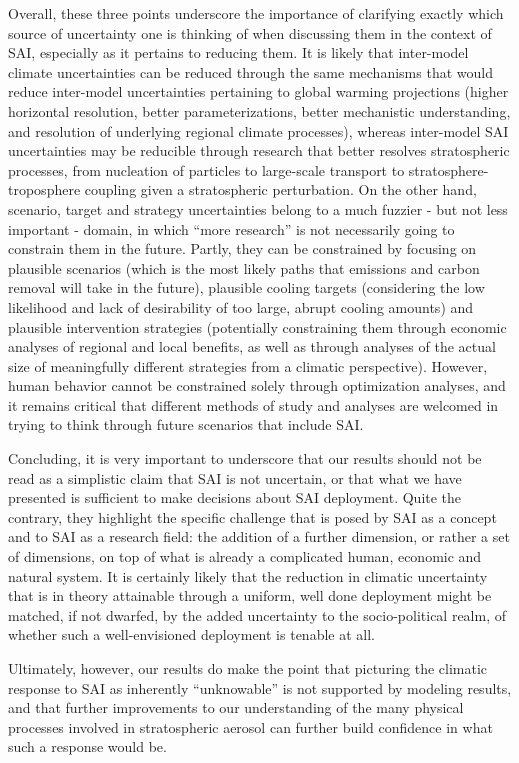 \documentclass[acp, manuscript]{copernicus}
\begin{document}
Overall, these three points underscore the importance of clarifying exactly which source of uncertainty one is thinking of when discussing them in the context of SAI, especially as it pertains to reducing them. It is likely that inter-model climate uncertainties can be reduced through the same mechanisms that would reduce inter-model uncertainties pertaining to global warming projections (higher horizontal resolution, better parameterizations, better mechanistic understanding, and resolution of underlying regional climate processes), whereas inter-model SAI uncertainties may be reducible through research that better resolves stratospheric processes, from nucleation of particles to large-scale transport to stratosphere-troposphere coupling given a stratospheric perturbation. On the other hand, scenario, target and strategy uncertainties belong to a much fuzzier - but not less important - domain, in which ``more research'' is not necessarily going to constrain them in the future. Partly, they can be constrained by focusing on plausible scenarios (which is the most likely paths that emissions and carbon removal will take in the future), plausible cooling targets (considering the low likelihood and lack of desirability of too large, abrupt cooling amounts) and plausible intervention strategies (potentially constraining them through economic analyses of regional and local benefits, as well as through analyses of the actual size of meaningfully different strategies from a climatic perspective). However, human behavior cannot be constrained solely through optimization analyses, and it remains critical that different methods of study and analyses are welcomed in trying to think through future scenarios that include SAI. 

Concluding, it is very important to underscore that our results should not be read as a simplistic claim that SAI is not uncertain, or that what we have presented is sufficient to make decisions about SAI deployment. Quite the contrary, they highlight the specific challenge that is posed by SAI as a concept and to SAI as a research field: the addition of a further dimension, or rather a set of dimensions, on top of what is already a complicated human, economic and natural system. It is certainly likely that the reduction in climatic uncertainty that is in theory attainable through a uniform, well done deployment might be matched, if not dwarfed, by the added uncertainty to the socio-political realm, of whether such a well-envisioned deployment is tenable at all.

Ultimately, however, our results do make the point that picturing the climatic response to SAI as inherently ``unknowable'' is not supported by modeling results, and that further improvements to our understanding of the many physical processes involved in stratospheric aerosol can further build confidence in what such a response would be.
\end{document}
